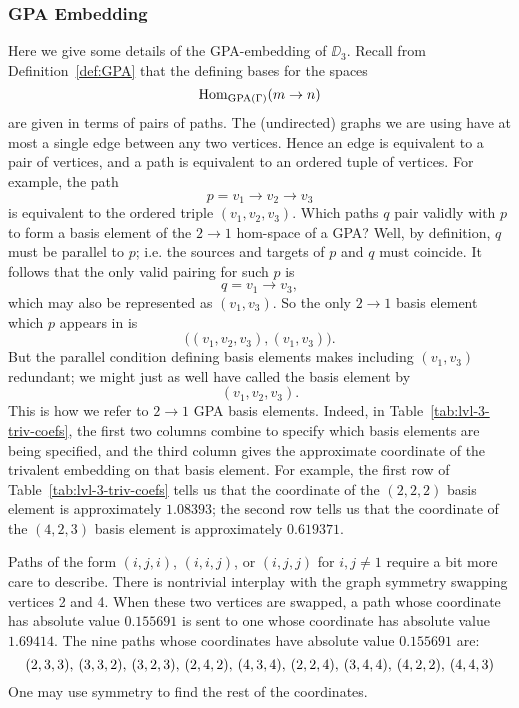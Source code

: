 \subsubsection{GPA Embedding}
Here we give some details of the GPA-embedding of $\DD_3$. 
Recall from Definition~\ref{def:GPA} that the defining bases for the spaces 
\[
    \operatorname{Hom}_{\operatorname{GPA}(\Gamma)}(m\to n)
\]
are given in terms of pairs of paths. 
The (undirected) graphs we are using have at most a single edge between any two vertices. 
Hence an edge is equivalent to a pair of vertices, and a path is equivalent to an ordered tuple of vertices. 
For example, the path
\[
    p = v_1 \longrightarrow v_2 \longrightarrow v_3
\]
is equivalent to the ordered triple $(v_1,v_2,v_3)$. 
Which paths $q$ pair validly with $p$ to form a basis element of the $2\to 1$ hom-space of a GPA? 
Well, by definition, $q$ must be parallel to $p$; i.e. the sources and targets of $p$ and $q$ must coincide. 
It follows that the only valid pairing for such $p$ is
\[
    q = v_1 \longrightarrow v_3,
\]
which may also be represented as $(v_1,v_3)$. 
So the only $2\to 1$ basis element which $p$ appears in is
\[
    \big( (v_1,v_2,v_3), (v_1,v_3) \big).
\]
But the parallel condition defining basis elements makes including $(v_1,v_3)$ redundant; we might just as well have called the basis element by 
\[
    (v_1,v_2,v_3).
\]
This is how we refer to $2\to 1$ GPA basis elements. 
Indeed, in Table~\ref{tab:lvl-3-triv-coefs}, the first two columns combine to specify which basis elements are being specified, and the third column gives the approximate coordinate of the trivalent embedding on that basis element. 
For example, the first row of Table~\ref{tab:lvl-3-triv-coefs} tells us that the coordinate of the $(2,2,2)$ basis element is approximately $1.08393$; the second row tells us that the coordinate of the $(4,2,3)$ basis element is approximately $0.619371$. 

Paths of the form $(i,j,i)$, $(i,i,j)$, or $(i,j,j)$ for $i,j\neq1$ require a bit more care to describe. 
There is nontrivial interplay with the graph symmetry swapping vertices 2 and 4. 
When these two vertices are swapped, a path whose coordinate has absolute value $0.155691$ is sent to one whose coordinate has absolute value $1.69414$. 
The nine paths whose coordinates have absolute value $0.155691$ are:
\[
    (2,3,3),\hspace{0.2em} (3,3,2),\hspace{0.2em} (3,2,3),\hspace{0.2em} (2,4,2),\hspace{0.2em} (4,3,4),\hspace{0.2em} (2,2,4),\hspace{0.2em} (3,4,4),\hspace{0.2em} (4,2,2),\hspace{0.2em} (4,4,3) 
\]
One may use symmetry to find the rest of the coordinates.

